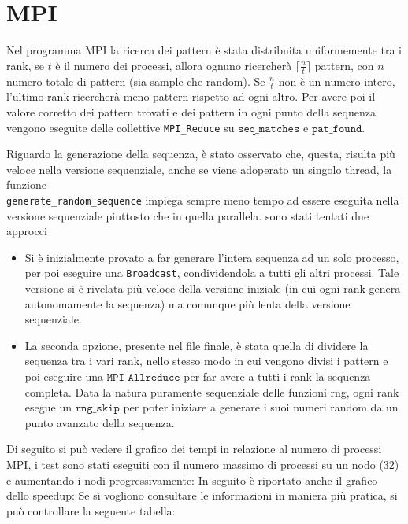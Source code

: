 \documentclass[12pt,openany]{report}
\begin{document}
\newpage
\section{MPI}
Nel programma MPI la ricerca dei pattern è stata distribuita uniformemente tra i rank, se $t$ è il numero dei processi, allora ognuno ricercherà $\lceil \frac{n}{t}\rceil$ pattern, con $n$ numero totale di pattern (sia sample che random). Se $\frac{n}{t}$ non è un numero intero, l'ultimo rank ricercherà meno pattern rispetto ad ogni altro. Per avere poi il valore corretto dei pattern trovati e dei pattern in ogni punto della sequenza vengono eseguite delle collettive \texttt{MPI\_Reduce} su $\texttt{seq\_matches}$ e $\texttt{pat\_found}$.

\bigskip 
Riguardo la generazione della sequenza,
è stato osservato che, questa, risulta  più veloce nella versione sequenziale, anche se viene adoperato un singolo thread, la funzione\\ \texttt{generate\_random\_sequence} impiega sempre meno tempo ad essere eseguita nella versione sequenziale piuttosto che in quella parallela.
sono stati tentati due approcci\begin{itemize}
    \item 
Si è inizialmente provato a far generare l'intera sequenza ad un solo processo, per poi eseguire una \texttt{Broadcast}, condividendola a tutti gli altri processi. Tale versione si è rivelata più veloce della versione iniziale (in cui ogni rank genera autonomamente la sequenza) ma comunque più lenta della versione sequenziale.
\item  La seconda opzione, presente nel file finale, è stata quella di dividere la sequenza tra i vari rank, nello stesso modo in cui vengono divisi i pattern e poi eseguire una $\texttt{MPI\_Allreduce}$ per far avere a tutti i rank la sequenza completa. Data la natura puramente sequenziale delle funzioni rng, ogni rank esegue un $\texttt{rng\_skip}$ per poter iniziare a generare i suoi numeri random da un punto avanzato della sequenza.\end{itemize}
Di seguito si può vedere il grafico dei tempi in relazione al numero di processi MPI, i test sono stati eseguiti con il numero massimo di processi su un nodo (32) e aumentando i nodi progressivamente:
In seguito è riportato anche il grafico dello speedup:
Se si vogliono consultare le informazioni in maniera più pratica, si può controllare la seguente tabella:
\end{document}
